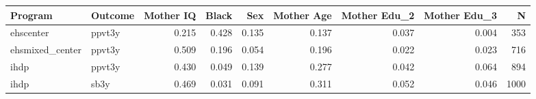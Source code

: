 \begin{table}[ht]
\centering
\begin{tabular}{llrrrrrrr}
  \hline
Program & Outcome & Mother IQ & Black & Sex & Mother Age & Mother Edu\_2 & Mother Edu\_3 & N \\ 
  \hline
ehscenter & ppvt3y & 0.215 & 0.428 & 0.135 & 0.137 & 0.037 & 0.004 & 353 \\ 
  ehsmixed\_center & ppvt3y & 0.509 & 0.196 & 0.054 & 0.196 & 0.022 & 0.023 & 716 \\ 
  ihdp & ppvt3y & 0.430 & 0.049 & 0.139 & 0.277 & 0.042 & 0.064 & 894 \\ 
  ihdp & sb3y & 0.469 & 0.031 & 0.091 & 0.311 & 0.052 & 0.046 & 1000 \\ 
   \hline
\end{tabular}
\end{table}

